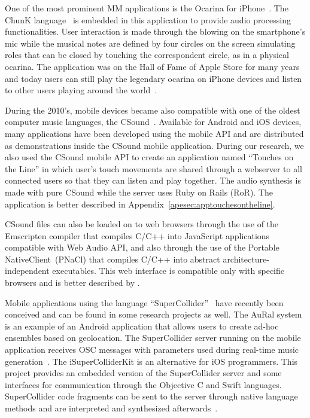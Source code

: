 One of the most prominent MM applications is the Ocarina for iPhone~\citep{Wang2008domobilephones}.
The ChunK language~\citep{wang2003chuck} is embedded in this application to provide audio processing functionalities.
User interaction is made through the blowing on the smartphone's mic while the musical notes are defined by four circles on the screen simulating roles that can be closed by touching the correspondent circle, as in a physical ocarina.
The application was on the Hall of Fame of Apple Store for many years and today users can still play the legendary ocarina on iPhone devices and listen to other users playing around the world~\citep{Wang2014ocarina}. 

During the 2010's, mobile devices became also compatible with one of the oldest computer music languages, the CSound~\citep{Vercoe1990csound}.
Available for Android and iOS devices, many applications have been developed using the mobile API and are distributed as demonstrations inside the CSound mobile application.
During our research, we also used the CSound mobile API to create an application named ``Touches on the Line'' in which user's touch movements are shared through a webserver to all connected users so that they can listen and play together.
The audio synthesis is made with pure CSound while the server uses Ruby on Rails (RoR).
The application is better described in Appendix~\ref{apesec:apptouchesontheline}.

CSound files can also be loaded on to web browsers through the use of the Emscripten compiler that compiles C/C++ into JavaScript applications compatible with Web Audio API, and also through the use of the Portable NativeClient~(PNaCl) that compiles C/C++ into abstract architecture-independent executables.
This web interface is compatible only with specific browsers and is better described by \cite{Lazzarini2014csound}.

Mobile applications using the language ``SuperCollider''~\citep{Mccartney2002supercollider} have recently been conceived and can be found in some research projects as well.
The AuRal system is an example of an Android application that allows users to create ad-hoc ensembles based on geolocation.
The SuperCollider server running on the mobile application receives OSC messages with parameters used during real-time music generation~\citep{Allison2012aural}.
The iSuperColliderKit is an alternative for iOS programmers.
This project provides an embedded version of the SuperCollider server and some interfaces for communication through the Objective C and Swift languages.
SuperCollider code fragments can be sent to the server through native language methods and are interpreted and synthesized afterwards~\citep{Ito2015isupercolliderkit}.

